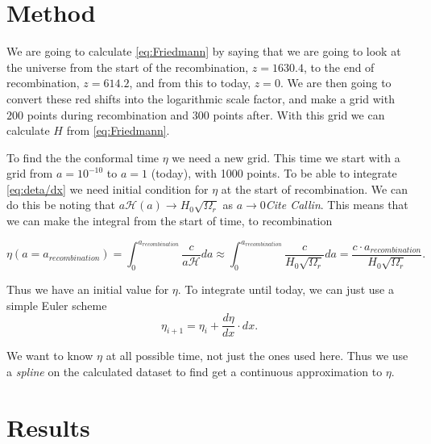 \documentclass[a4paper,norsk, 10pt]{article}
\begin{document}
\section{Method}

We are going to calculate \eqref{eq:Friedmann} by saying that we are going to look at the universe from the start of the recombination, $z = 1630.4$, to the end of recombination, $z = 614.2$, and from this to today, $z = 0$. We are then going to convert these red shifts into the logarithmic scale factor, and make a grid with $200$ points during recombination and $300$ points after. With this grid we can calculate $H$ from \eqref{eq:Friedmann}.

To find the the conformal time $\eta$ we need a new grid. This time we start with a grid from $a=10^{-10}$ to $a=1$ (today), with 1000 points. To be able to integrate \eqref{eq:deta/dx} we need initial condition for $\eta$ at the start of recombination. We can do this be noting that $a\mathcal{H}(a) \rightarrow H_0\sqrt{\Omega_r}$ as $a\rightarrow 0$\emph{Cite Callin}. This means that we can make the integral from the start of time, to recombination

\begin{equation}
\eta(a=a_{recombination}) = \int_0^{a_{recombination}} \frac{c}{a\mathcal{H}}da \approx \int_0^{a_{recombination}} \frac{c}{H_0\sqrt{\Omega_r}}da = \frac{c\cdot a_{recombination}}{H_0\sqrt{\Omega_r}}.
\end{equation}

Thus we have an initial value for $\eta$. To integrate until today, we can just use a simple Euler scheme
\begin{equation}
\eta_{i+1} = \eta_i + \frac{d\eta}{dx}\cdot dx.
\end{equation}

We want to know $\eta$ at all possible time, not just the ones used here. Thus we use a \textit{spline} on the calculated dataset to find get a continuous approximation to $\eta$.

\section{Results}
\end{document}
